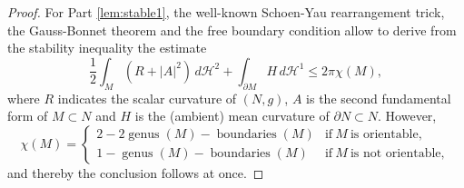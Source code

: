 \documentclass[JEP,XML,SOM,Unicode]{cedram}
\newcounter{cas}
\DeclareMathOperator{\boundaries}{boundaries}
\DeclareMathOperator{\genus}{genus}
\theoremstyle{definition}
\newcommand{\h}{\mathscr{H}}
\begin{document}
\begin{proof}
For Part \eqref{lem:stable1}, the well-known Schoen-Yau rearrangement trick, the Gauss-Bonnet theorem and the free boundary condition allow to derive from the stability inequality the estimate
\begin{equation}\label{eq:STAB}
\frac{1}{2}\int_{M}(R+|A|^2)\,d\h^2+\int_{\partial M}H\,d\h^1\leq 2\pi\chi(M),
\end{equation}
where $R$ indicates the scalar curvature of $(N,g)$, $A$ is the second fundamental form of $M\subset N$ and $H$ is the (ambient) mean curvature of $\partial N\subset N$. However,
\begin{equation}\label{eq:chiFBMS}
\chi(M)=
\begin{cases}
2-2\genus(M)-\boundaries(M) & \text{if} \ M \ \text{is orientable}, \\
1-\genus(M)-\boundaries(M) & \text{if} \ M \ \text{is not orientable},
\end{cases}
\end{equation}
and thereby the conclusion follows at once.


\end{proof}
\end{document}
